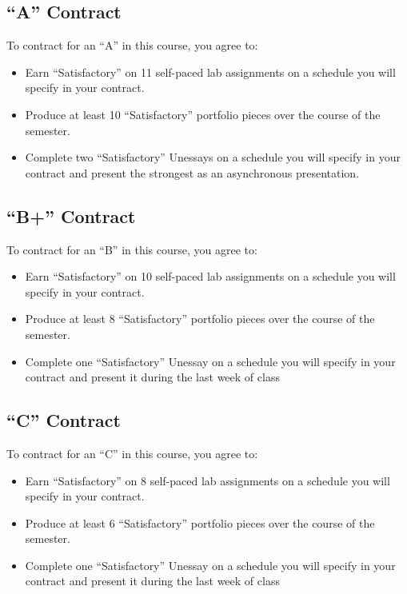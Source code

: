 \documentclass[
]{book}
\begin{document}
\hypertarget{a-contract}{%
\subsection{``A'' Contract}\label{a-contract}}

To contract for an ``A'' in this course, you agree to:

\begin{itemize}
\item
  Earn ``Satisfactory'' on 11 self-paced lab assignments on a schedule you will specify in your contract.
\item
  Produce at least 10 ``Satisfactory'' portfolio pieces over the course of the semester.
\item
  Complete two ``Satisfactory'' Unessays on a schedule you will specify in your contract and present the strongest as an asynchronous presentation.
\end{itemize}

\hypertarget{b-contract}{%
\subsection{``B+'' Contract}\label{b-contract}}

To contract for an ``B'' in this course, you agree to:

\begin{itemize}
\item
  Earn ``Satisfactory'' on 10 self-paced lab assignments on a schedule you will specify in your contract.
\item
  Produce at least 8 ``Satisfactory'' portfolio pieces over the course of the semester.
\item
  Complete one ``Satisfactory'' Unessay on a schedule you will specify in your contract and present it during the last week of class
\end{itemize}

\hypertarget{c-contract}{%
\subsection{``C'' Contract}\label{c-contract}}

To contract for an ``C'' in this course, you agree to:

\begin{itemize}
\item
  Earn ``Satisfactory'' on 8 self-paced lab assignments on a schedule you will specify in your contract.
\item
  Produce at least 6 ``Satisfactory'' portfolio pieces over the course of the semester.
\item
  Complete one ``Satisfactory'' Unessay on a schedule you will specify in your contract and present it during the last week of class
\end{itemize}
\end{document}
